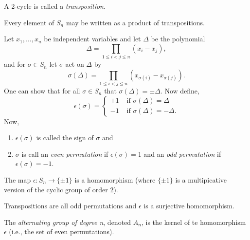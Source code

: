 \documentclass[../main]{subfiles}
\begin{document}
  
  \begin{dfn}
   A 2-cycle is called a \textit{transposition}.
  \end{dfn}
  
  
  \begin{nt}
   Every element of $S_n$ may be written as a product of transpositions.
  \end{nt}
  
  
  \begin{dfn}
   Let $x_1,\ldots,x_n$ be independent variables and let $\Delta$ be the polynomial 
   \[\Delta = \prod_{1\leq i < j \leq n} (x_i - x_j),\] 
   and for $\sigma \in S_n$ let $\sigma$ act on $\Delta$ by
   \[\sigma(\Delta)= \prod_{1\leq i < j \leq n} (x_{\sigma(i)} - x_{\sigma(j)}).\]
   One can show that for all $\sigma \in S_n$ that $\sigma(\Delta) = \pm \Delta$. Now define,
   \begin{equation*}
    \epsilon(\sigma)= 
   \begin{cases}
    +1 & \text{ if } \sigma(\Delta) = \Delta \\
    -1 & \text{ if } \sigma(\Delta) = -\Delta.
   \end{cases}
   \end{equation*}
   Now, 
   \begin{enumerate}
    \item $\epsilon(\sigma)$ is called the sign of $\sigma$ and 
    \item $\sigma$ is call an \textit{even permutation} if $\epsilon(\sigma) = 1$ and an \textit{odd permutation} if $\epsilon(\sigma) = -1$.
   \end{enumerate}
  \end{dfn}
  
  
  \begin{prop}
   The map $\epsilon \colon S_n \to \{\pm 1\}$ is a homomorphism (where $\{\pm 1 \}$ is a multipicative version of the cyclic group of order 2).
  \end{prop}
  
  
  \begin{prop}
   Transpositions are all odd permutations and $\epsilon$ is a surjective homomorphism.
  \end{prop}
  
  
  \begin{dfn}
   The \textit{alternating group of degree n}, denoted $A_n$, is the kernel of te homomorphism $\epsilon$ (i.e., the set of even permutations).
  \end{dfn}
  
\end{document}
